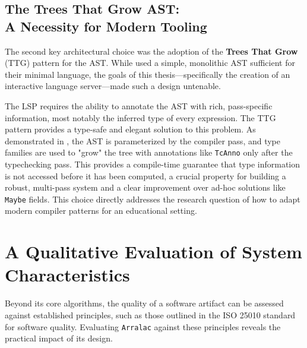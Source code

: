 \subsection{The Trees That Grow AST: \\ A Necessity for Modern Tooling}
The second key architectural choice was the adoption of the \textbf{Trees That Grow} (TTG) pattern for the AST. While \cite{jones-practical-2007} used a simple, monolithic AST sufficient for their minimal language, the goals of this thesis---specifically the creation of an interactive language server---made such a design untenable.

The LSP requires the ability to annotate the AST with rich, pass-specific information, most notably the inferred type of every expression. The TTG pattern provides a type-safe and elegant solution to this problem. As demonstrated in , the AST is parameterized by the compiler pass, and type families are used to "grow" the tree with annotations like \texttt{TcAnno} only after the typechecking pass. This provides a compile-time guarantee that type information is not accessed before it has been computed, a crucial property for building a robust, multi-pass system and a clear improvement over ad-hoc solutions like \texttt{Maybe} fields. This choice directly addresses the research question of how to adapt modern compiler patterns for an educational setting.

\section{A Qualitative Evaluation of System Characteristics}
\label{sec:Discussion:Characteristics}
Beyond its core algorithms, the quality of a software artifact can be assessed against established principles, such as those outlined in the ISO 25010 standard for software quality. Evaluating \texttt{Arralac} against these principles reveals the practical impact of its design.

